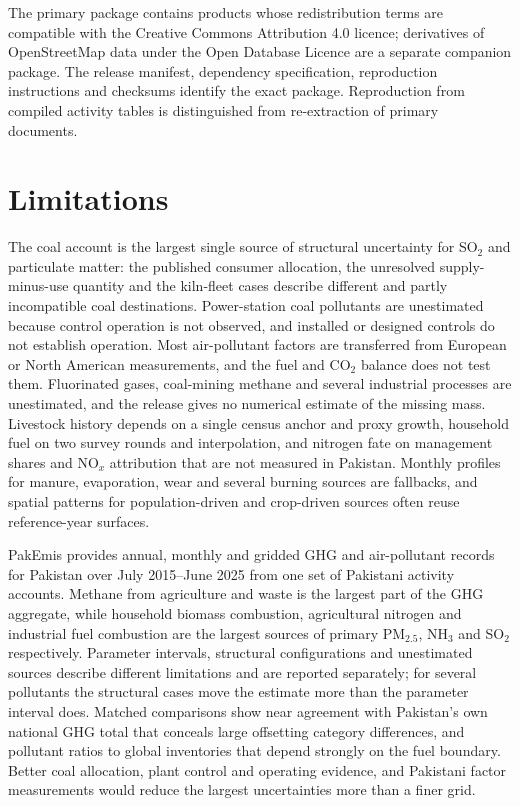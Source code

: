 \documentclass[essd,manuscript]{copernicus}
\begin{document}
The primary package contains products whose redistribution terms are compatible with the Creative Commons Attribution 4.0 licence; derivatives of OpenStreetMap data under the Open Database Licence are a separate companion package. The release manifest, dependency specification, reproduction instructions and checksums identify the exact package. Reproduction from compiled activity tables is distinguished from re-extraction of primary documents.

\section{Limitations}
\label{sec:limitations}
The coal account is the largest single source of structural uncertainty for SO$_2$ and particulate matter: the published consumer allocation, the unresolved supply-minus-use quantity and the kiln-fleet cases describe different and partly incompatible coal destinations. Power-station coal pollutants are unestimated because control operation is not observed, and installed or designed controls do not establish operation. Most air-pollutant factors are transferred from European or North American measurements, and the fuel and CO$_2$ balance does not test them. Fluorinated gases, coal-mining methane and several industrial processes are unestimated, and the release gives no numerical estimate of the missing mass. Livestock history depends on a single census anchor and proxy growth, household fuel on two survey rounds and interpolation, and nitrogen fate on management shares and NO$_x$ attribution that are not measured in Pakistan. Monthly profiles for manure, evaporation, wear and several burning sources are fallbacks, and spatial patterns for population-driven and crop-driven sources often reuse reference-year surfaces.

\FloatBarrier
\conclusions
PakEmis provides annual, monthly and gridded GHG and air-pollutant records for Pakistan over July 2015--June 2025 from one set of Pakistani activity accounts. Methane from agriculture and waste is the largest part of the GHG aggregate, while household biomass combustion, agricultural nitrogen and industrial fuel combustion are the largest sources of primary PM$_{2.5}$, NH$_3$ and SO$_2$ respectively. Parameter intervals, structural configurations and unestimated sources describe different limitations and are reported separately; for several pollutants the structural cases move the estimate more than the parameter interval does. Matched comparisons show near agreement with Pakistan's own national GHG total that conceals large offsetting category differences, and pollutant ratios to global inventories that depend strongly on the fuel boundary. Better coal allocation, plant control and operating evidence, and Pakistani factor measurements would reduce the largest uncertainties more than a finer grid.
\end{document}
